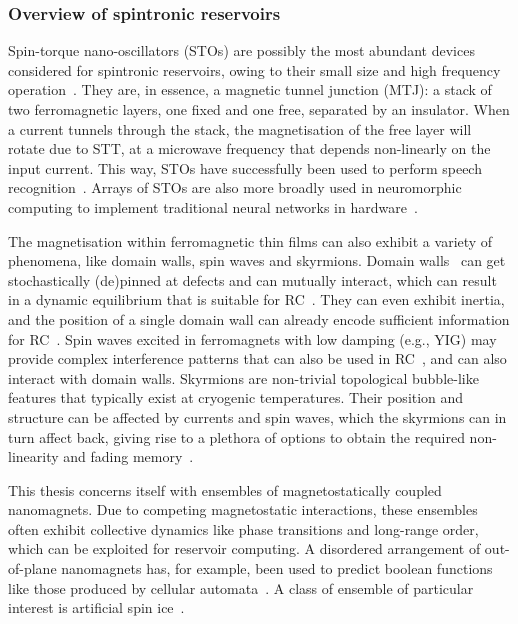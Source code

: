 \subsubsection{Overview of spintronic reservoirs}
Spin-torque nano-oscillators (STOs) are possibly the most abundant devices considered for spintronic reservoirs, owing to their small size and high frequency operation~\cite{tsunegi2019STOforcedsyncRC}.
They are, in essence, a magnetic tunnel junction (MTJ): a stack of two ferromagnetic layers, one fixed and one free, separated by an insulator.
When a current tunnels through the stack, the magnetisation of the free layer will rotate due to STT, at a microwave frequency that depends non-linearly on the input current.
This way, STOs have successfully been used to perform speech recognition~\cite{STO_RC_Riou2021,NeuromorphicOscillators}.
Arrays of STOs are also more broadly used in neuromorphic computing to implement traditional neural networks in hardware~\cite{VowelRecognition4STO}. \par
The magnetisation within ferromagnetic thin films can also exhibit a variety of phenomena, like domain walls, spin waves and skyrmions.
Domain walls~\cite{Venkat_2024} can get stochastically (de)pinned at defects and can mutually interact, which can result in a dynamic equilibrium that is suitable for RC~\cite{DynamicEmergence_NanomagneticSystem}.
They can even exhibit inertia, and the position of a single domain wall can already encode sufficient information for RC~\cite{RC_DW}.
Spin waves excited in ferromagnets with low damping (e.g., YIG) may provide complex interference patterns that can also be used in RC~\cite{RC_SpinWaveInterference}, and can also interact with domain walls.
Skyrmions are non-trivial topological bubble-like features that typically exist at cryogenic temperatures.
Their position and structure can be affected by currents and spin waves, which the skyrmions can in turn affect back, giving rise to a plethora of options to obtain the required non-linearity and fading memory~\cite{RC_TaskAgnosticMetrics_v2,RC_SkyrmionCrystalSW}. \par
This thesis concerns itself with ensembles of magnetostatically coupled nanomagnets.
Due to competing magnetostatic interactions, these ensembles often exhibit collective dynamics like phase transitions and long-range order, which can be exploited for reservoir computing.
A disordered arrangement of out-of-plane nanomagnets has, for example, been used to predict boolean functions like those produced by cellular automata~\cite{RC_PassiveFrustratedNM,RC_DipoleNanomagnets}.
A class of ensemble of particular interest is artificial spin ice~\cite{RC_ASI}.

